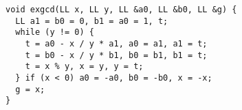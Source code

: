 \begin{lstlisting}
void exgcd(LL x, LL y, LL &a0, LL &b0, LL &g) {
  LL a1 = b0 = 0, b1 = a0 = 1, t;
  while (y != 0) {
    t = a0 - x / y * a1, a0 = a1, a1 = t;
    t = b0 - x / y * b1, b0 = b1, b1 = t;
    t = x % y, x = y, y = t;
  } if (x < 0) a0 = -a0, b0 = -b0, x = -x;
  g = x;
}
\end{lstlisting}